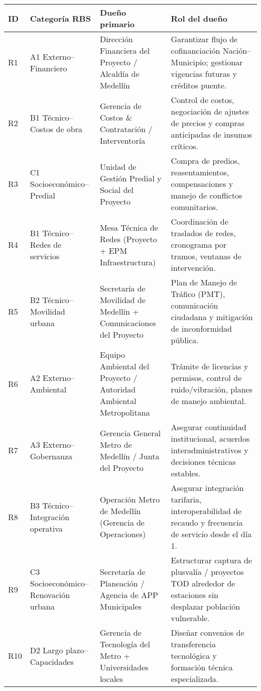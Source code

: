 \begin{table}[H]\centering\small
\begin{tabular}{p{1cm}p{4cm}p{4cm}p{5cm}}
\toprule
\textbf{ID} & \textbf{Categoría RBS} & \textbf{Dueño primario} & \textbf{Rol del dueño} \\
\midrule
R1 & A1 Externo--Financiero & Dirección Financiera del Proyecto / Alcaldía de Medellín & Garantizar flujo de cofinanciación Nación--Municipio; gestionar vigencias futuras y créditos puente. \\
R2 & B1 Técnico--Costos de obra & Gerencia de Costos \& Contratación / Interventoría & Control de costos, negociación de ajustes de precios y compras anticipadas de insumos críticos. \\
R3 & C1 Socioeconómico--Predial & Unidad de Gestión Predial y Social del Proyecto & Compra de predios, reasentamientos, compensaciones y manejo de conflictos comunitarios. \\
R4 & B1 Técnico--Redes de servicios & Mesa Técnica de Redes (Proyecto + EPM Infraestructura) & Coordinación de traslados de redes, cronograma por tramos, ventanas de intervención. \\
R5 & B2 Técnico--Movilidad urbana & Secretaría de Movilidad de Medellín + Comunicaciones del Proyecto & Plan de Manejo de Tráfico (PMT), comunicación ciudadana y mitigación de inconformidad pública. \\
R6 & A2 Externo--Ambiental & Equipo Ambiental del Proyecto / Autoridad Ambiental Metropolitana & Trámite de licencias y permisos, control de ruido/vibración, planes de manejo ambiental. \\
R7 & A3 Externo--Gobernanza & Gerencia General Metro de Medellín / Junta del Proyecto & Asegurar continuidad institucional, acuerdos interadministrativos y decisiones técnicas estables. \\
R8 & B3 Técnico--Integración operativa & Operación Metro de Medellín (Gerencia de Operaciones) & Asegurar integración tarifaria, interoperabilidad de recaudo y frecuencia de servicio desde el día 1. \\
R9 & C3 Socioeconómico--Renovación urbana & Secretaría de Planeación / Agencia de APP Municipales & Estructurar captura de plusvalía / proyectos TOD alrededor de estaciones sin desplazar población vulnerable. \\
R10& D2 Largo plazo--Capacidades & Gerencia de Tecnología del Metro + Universidades locales & Diseñar convenios de transferencia tecnológica y formación técnica especializada. \\
\bottomrule
\end{tabular}
\end{table}



